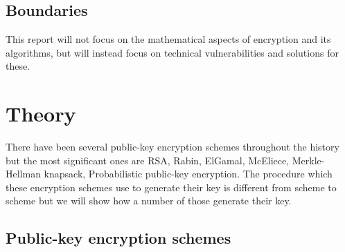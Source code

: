 \documentclass{acm_proc_article-sp}
\begin{document}
\subsection{Boundaries}
This report will not focus on the mathematical aspects of encryption and its algorithms, but will instead focus on technical vulnerabilities and  solutions for these. 

\section{Theory}
There have been several public-key encryption schemes throughout the history but the most significant ones are RSA, Rabin, ElGamal, McEliece, Merkle-Hellman knapsack, Probabilistic public-key encryption. The procedure which these encryption schemes use to generate their key is different from scheme to scheme but we will show how a number of those generate their key.
\subsection{Public-key encryption schemes}
\end{document}
